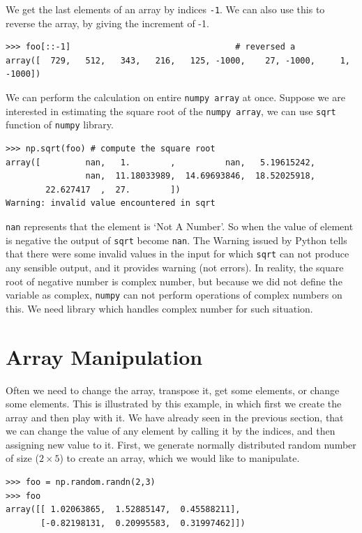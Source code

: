 \documentclass[10pt]{book}
\begin{document}
{We get the last elements of an array by indices \verb"-1". We can also use this to reverse the array, by giving the increment of -1.
\beforeverb \begin{verbatim}
>>> foo[::-1]                                 # reversed a
array([  729,   512,   343,   216,   125, -1000,    27, -1000,     1, -1000])
\end{verbatim} \afterverb
We can perform the calculation on entire \verb"numpy array" at once. Suppose we are interested in estimating the square root of the \verb"numpy array", we can use \verb"sqrt" function of \verb"numpy" library. 
\beforeverb \begin{verbatim}
>>> np.sqrt(foo) # compute the square root 
array([         nan,   1.        ,          nan,   5.19615242,
                nan,  11.18033989,  14.69693846,  18.52025918,
        22.627417  ,  27.        ])
Warning: invalid value encountered in sqrt
\end{verbatim} \afterverb

\verb"nan" represents that the element is `Not A Number'. So when the value of element is negative the output of \verb"sqrt" become \verb"nan". The Warning issued by Python tells that there were some invalid values in the input for which \verb"sqrt" can not produce any sensible output, and it provides  warning (not errors). In reality, the square root of negative number is complex number, but because we did not define the variable as complex, \verb"numpy" can not perform operations of complex numbers on this. We need library which handles complex number for such situation. 

\section{Array Manipulation}
Often we need to change the array, transpose it, get some elements, or change some elements. This is illustrated by this example, in which first we create the array and then play with it. We have already seen in the previous section, that we can change the value of any element by calling it by the indices, and then assigning new value to it. First, we generate normally distributed random number of size ($2 \times 5$) to create an array, which we would like to manipulate. 
\beforeverb \begin{verbatim}
>>> foo = np.random.randn(2,3)
>>> foo
array([[ 1.02063865,  1.52885147,  0.45588211],
       [-0.82198131,  0.20995583,  0.31997462]])
\end{verbatim} \afterverb

}
\end{document}
